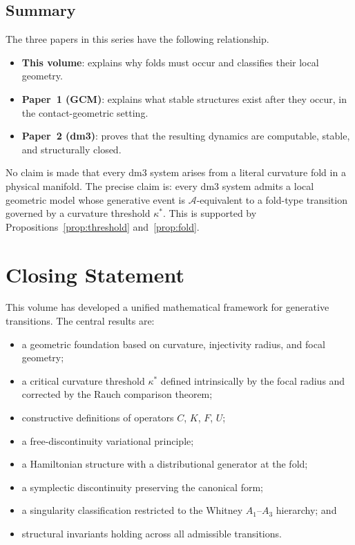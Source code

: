 \documentclass[12pt, oneside]{book}
\theoremstyle{plain}
\theoremstyle{definition}
\theoremstyle{remark}
\begin{document}
\subsection{Summary}

The three papers in this series have the following relationship.
\begin{itemize}[leftmargin=*]
  \item \textbf{This volume}: explains why folds must occur and
        classifies their local geometry.
  \item \textbf{Paper~1 (GCM)}: explains what stable structures
        exist after they occur, in the contact-geometric setting.
  \item \textbf{Paper~2 (dm3)}: proves that the resulting dynamics
        are computable, stable, and structurally closed.
\end{itemize}

No claim is made that every dm3 system arises from a literal
curvature fold in a physical manifold. The precise claim is:
every dm3 system admits a local geometric model whose generative
event is $\mathcal{A}$-equivalent to a fold-type transition governed
by a curvature threshold $\kappa^*$. This is supported by
Propositions~\ref{prop:threshold} and~\ref{prop:fold}.

\section*{Closing Statement}

This volume has developed a unified mathematical framework for
generative transitions. The central results are:
\begin{itemize}
\item a geometric foundation based on curvature, injectivity radius,
  and focal geometry;
\item a critical curvature threshold $\kappa^*$ defined intrinsically
  by the focal radius and corrected by the Rauch comparison theorem;
\item constructive definitions of operators $C$, $K$, $F$, $U$;
\item a free-discontinuity variational principle;
\item a Hamiltonian structure with a distributional generator at the
  fold;
\item a symplectic discontinuity preserving the canonical form;
\item a singularity classification restricted to the Whitney
  $A_1$--$A_3$ hierarchy; and
\item structural invariants holding across all admissible transitions.
\end{itemize}
\end{document}
